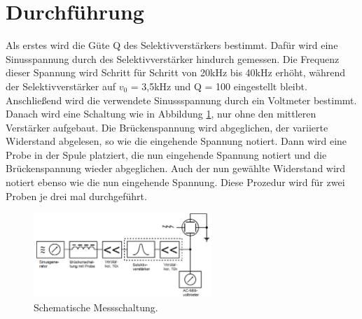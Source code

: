 \section{Durchführung}
\label{sec:Durchführung}
Als erstes wird die Güte Q des Selektivverstärkers bestimmt. Dafür wird eine Sinusspannung durch des Selektivverstärker hindurch gemessen. 
Die Frequenz dieser Spannung wird Schritt für Schritt von 20kHz bis 40kHz erhöht, während der Selektivverstärker auf $v_0$ = 3,5kHz und Q = 100 
eingestellt bleibt.
Anschließend wird die verwendete Sinussspannung durch ein Voltmeter bestimmt.
Danach wird eine Schaltung wie in Abbildung \ref{fig:3}, nur ohne den mittleren Verstärker aufgebaut.
Die Brückenspannung wird abgeglichen, der variierte Widerstand abgelesen, so wie die eingehende Spannung notiert.
Dann wird eine Probe in der Spule platziert, die nun eingehende Spannung notiert und die Brückenspannung wieder abgeglichen. 
Auch der nun gewählte Widerstand wird notiert ebenso wie die nun eingehende Spannung.
Diese Prozedur wird für zwei Proben je drei mal durchgeführt.

\begin{figure}
    \centering
    \includegraphics[width = 0.60\textwidth]{V606Bild3.png}
    \caption{Schematische Messschaltung.}
    \label{fig:3}
\end{figure}

